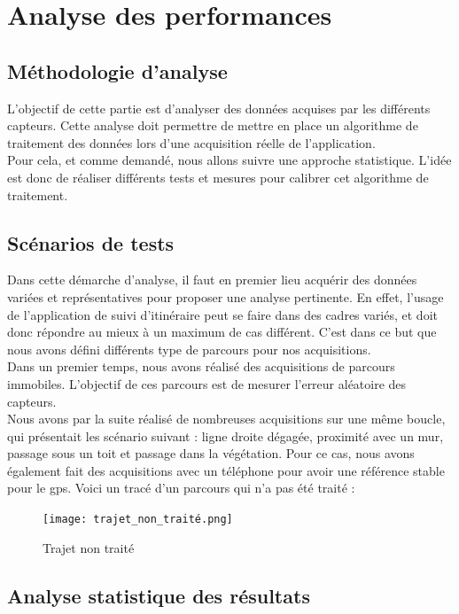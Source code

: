 \chapter{Analyse des performances}

\section{Méthodologie d’analyse}
L'objectif de cette partie est d'analyser des données acquises par les différents capteurs. Cette analyse doit permettre de mettre en place un algorithme de traitement des données lors d'une acquisition réelle de l'application. \\
Pour cela, et comme demandé, nous allons suivre une approche statistique. L'idée est donc de réaliser différents tests et mesures pour calibrer cet algorithme de traitement.

\section{Scénarios de tests}
Dans cette démarche d'analyse, il faut en premier lieu acquérir des données variées et représentatives pour proposer une analyse pertinente. En effet, l'usage de l'application de suivi d'itinéraire peut se faire dans des cadres variés, et doit donc répondre au mieux à un maximum de cas différent. C'est dans ce but que nous avons défini différents type de parcours pour nos acquisitions. \\

Dans un premier temps, nous avons réalisé des acquisitions de parcours immobiles. L'objectif de ces parcours est de mesurer l'erreur aléatoire des capteurs. \\

Nous avons par la suite réalisé de nombreuses acquisitions sur une même boucle, qui présentait les scénario suivant : ligne droite dégagée, proximité avec un mur, passage sous un toit et passage dans la végétation. Pour ce cas, nous avons également fait des acquisitions avec un téléphone pour avoir une référence stable pour le gps. Voici un tracé d'un parcours qui n'a pas été traité :

\begin{figure}[H]
    \centering
    \texttt{[image: trajet\_non\_traité.png]} %
    \caption{Trajet non traité}
    \label{fig:trajet non traité}
\end{figure}


\section{Analyse statistique des résultats}
